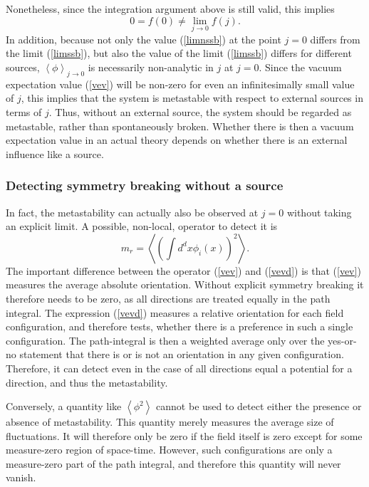 \documentclass[final,12pt]{article}
\newcommand*{\no}{\noindent}
\newcommand*{\be}{\begin{equation}}
\newcommand*{\ee}{\end{equation}}
\newcommand*{\pref}[1]{(\ref{#1})}
\newcommand*{\1}{1\!\!\!\bot}
\newcommand*{\la}{\left\langle}
\newcommand*{\ra}{\right\rangle}
\begin{document}
Nonetheless, since the integration argument above is still valid, this implies
\be
0=f(0)\neq\lim_{j\to 0}f(j)\label{limnssb}.
\ee
\no In addition, because not only the value \pref{limnssb} at the point $j=0$ differs from the limit \pref{limssb}, but also the value of the limit \pref{limssb} differs for different sources, $\la\phi\ra_{j\to 0}$ is necessarily non-analytic in $j$ at $j=0$. Since the vacuum expectation value \pref{vev} will be non-zero for even an infinitesimally small value of $j$, this implies that the system is metastable with respect to external sources in terms of $j$. Thus, without an external source, the system should be regarded as metastable, rather than spontaneously broken. Whether there is then a vacuum expectation value in an actual theory depends on whether there is an external influence like a source.

\subsubsection{Detecting symmetry breaking without a source}

In fact, the metastability can actually also be observed at $j=0$ without taking an explicit limit. A possible, non-local, operator to detect it is \cite{Langfeld:2002ic,Caudy:2007sf}
\be
m_r=\left\langle\left(\int d^dx\phi_i(x)\right)^2\right\rangle\label{vevd}.
\ee
\no The important difference between the operator \pref{vev} and \pref{vevd} is that \pref{vev} measures the average absolute orientation. Without explicit symmetry breaking it therefore needs to be zero, as all directions are treated equally in the path integral. The expression \pref{vevd} measures a relative orientation for each field configuration, and therefore tests, whether there is a preference in such a single configuration. The path-integral is then a weighted average only over the yes-or-no statement that there is or is not an orientation in any given configuration. Therefore, it can detect even in the case of all directions equal a potential for a direction, and thus the metastability.

Conversely, a quantity like $\la\phi^2\ra$ cannot be used to detect either the presence or absence of metastability. This quantity merely measures the average size of fluctuations. It will therefore only be zero if the field itself is zero except for some measure-zero region of space-time. However, such configurations are only a measure-zero part of the path integral, and therefore this quantity will never vanish.
\end{document}
